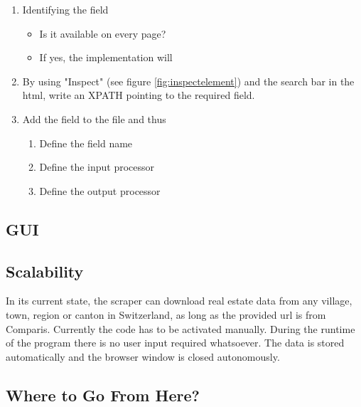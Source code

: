 \documentclass[main]{subfiles}
\begin{document}
\begin{enumerate}
    \item Identifying the field
    \begin{itemize}
        \item Is it available on every page?
        \item If yes, the implementation will 
    \end{itemize}
    \item By using "Inspect" (see figure \ref{fig:inspectelement}) and the search bar in the \acs*{html}, write an XPATH pointing to the required field.
    \item Add the field to the \pkg[items.py] file and thus
    \begin{enumerate}
        \item Define the field name
        \item Define the input processor
        \item Define the output processor
    \end{enumerate}
\end{enumerate}


\subsection{GUI}

\subsection{Scalability}
In its current state, the scraper can download real estate data from any village, town, region or canton in Switzerland,
as long as the provided \acs*{url} is from Comparis.
Currently the code has to be activated manually.
During the runtime of the program there is no user input required whatsoever.
The data is stored automatically and the browser window is closed autonomously.

\subsection{Where to Go From Here?}
\end{document}
